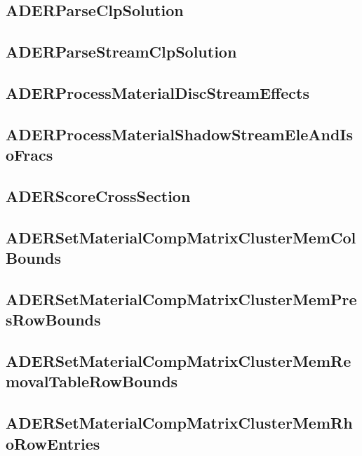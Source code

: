 \subsection{ADERParseClpSolution}


\subsection{ADERParseStreamClpSolution}


\subsection{ADERProcessMaterialDiscStreamEffects}


\subsection{ADERProcessMaterialShadowStreamEleAndIsoFracs}


\subsection{ADERScoreCrossSection}


\subsection{ADERSetMaterialCompMatrixClusterMemColBounds}


\subsection{ADERSetMaterialCompMatrixClusterMemPresRowBounds}


\subsection{ADERSetMaterialCompMatrixClusterMemRemovalTableRowBounds}


\subsection{ADERSetMaterialCompMatrixClusterMemRhoRowEntries}


